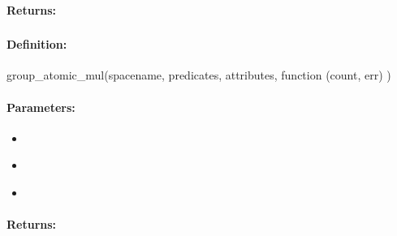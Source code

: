 \paragraph{Returns:}


\pagebreak
\subsubsection{}
\label{api:nodejs:group_atomic_mul}


\paragraph{Definition:}
\begin{javascriptcode}
group_atomic_mul(spacename, predicates, attributes, function (count, err) {})
\end{javascriptcode}
\paragraph{Parameters:}
\begin{itemize}[noitemsep]
\item {}\\

\item {}\\

\item {}\\

\end{itemize}

\paragraph{Returns:}


\pagebreak
\subsubsection{}
\label{api:nodejs:atomic_mul}


